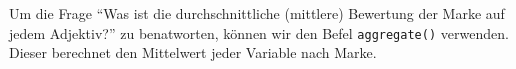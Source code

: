 \documentclass[12pt,]{book}
\newenvironment{Shaded}{\begin{snugshade}}{\end{snugshade}}
\newcommand{\KeywordTok}[1]{\textcolor[rgb]{0.13,0.29,0.53}{\textbf{{#1}}}}
\newcommand{\DataTypeTok}[1]{\textcolor[rgb]{0.13,0.29,0.53}{{#1}}}
\newcommand{\StringTok}[1]{\textcolor[rgb]{0.31,0.60,0.02}{{#1}}}
\newcommand{\CommentTok}[1]{\textcolor[rgb]{0.56,0.35,0.01}{\textit{{#1}}}}
\newcommand{\NormalTok}[1]{{#1}}
\begin{document}
Um die Frage ``Was ist die durchschnittliche (mittlere) Bewertung der
Marke auf jedem Adjektiv?'' zu benatworten, können wir den Befel
\texttt{aggregate()} verwenden. Dieser berechnet den Mittelwert jeder
Variable nach Marke.

\begin{Shaded}
\end{Shaded}
\end{document}
